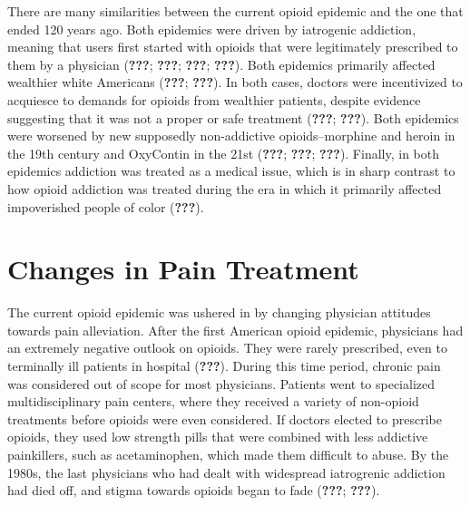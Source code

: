 \documentclass[12pt,twoside]{reedthesis}
\begin{document}
There are many similarities between the current opioid epidemic and the one that ended 120 years ago. Both epidemics were driven by iatrogenic addiction, meaning that users first started with opioids that were legitimately prescribed to them by a physician ({\textbf{???}}; {\textbf{???}}; {\textbf{???}}; {\textbf{???}}). Both epidemics primarily affected wealthier white Americans ({\textbf{???}}; {\textbf{???}}). In both cases, doctors were incentivized to acquiesce to demands for opioids from wealthier patients, despite evidence suggesting that it was not a proper or safe treatment ({\textbf{???}}; {\textbf{???}}). Both epidemics were worsened by new supposedly non-addictive opioids--morphine and heroin in the 19th century and OxyContin in the 21st ({\textbf{???}}; {\textbf{???}}; {\textbf{???}}). Finally, in both epidemics addiction was treated as a medical issue, which is in sharp contrast to how opioid addiction was treated during the era in which it primarily affected impoverished people of color ({\textbf{???}}).

\hypertarget{changes-in-pain-treatment}{%
\section{Changes in Pain Treatment}\label{changes-in-pain-treatment}}

The current opioid epidemic was ushered in by changing physician attitudes towards pain alleviation. After the first American opioid epidemic, physicians had an extremely negative outlook on opioids. They were rarely prescribed, even to terminally ill patients in hospital ({\textbf{???}}). During this time period, chronic pain was considered out of scope for most physicians. Patients went to specialized multidisciplinary pain centers, where they received a variety of non-opioid treatments before opioids were even considered. If doctors elected to prescribe opioids, they used low strength pills that were combined with less addictive painkillers, such as acetaminophen, which made them difficult to abuse. By the 1980s, the last physicians who had dealt with widespread iatrogrenic addiction had died off, and stigma towards opioids began to fade ({\textbf{???}}; {\textbf{???}}).
\end{document}

